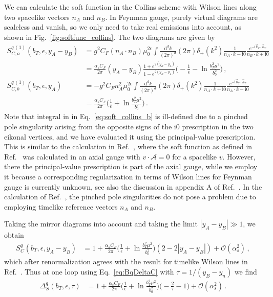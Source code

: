 \documentclass[11pt,a4paper]{article}
\DeclareRobustCommand{\eq}[1]{Eq.~\eqref{eq:#1}}
\DeclareRobustCommand{\fig}[1]{Fig.~\ref{fig:#1}}
\DeclareRobustCommand{\mycite}[1]{Ref.~\cite{#1}}
\newcommand{\df}{\mathrm{d}}
\newcommand{\img}{\mathrm{i}}
\newcommand{\eps}{\epsilon}
\newcommand{\cA}{\mathcal{A}}
\newcommand{\cO}{\mathcal{O}}
\newcommand{\nn}{\nonumber}
\newcommand{\as}{\alpha_s}
\newcommand{\bt}{\vec b_T}
\newcommand{\kt}{\vec k_T}
\begin{document}
We can calculate the soft function in the Collins scheme with Wilson lines along two spacelike vectors $n_A$ and $n_B$.
In Feynman gauge, purely virtual diagrams are scaleless and vanish, so we only need to take real emissions into account, as shown in \fig{softfunc_collins}.
The two diagrams are given by
\begin{align} \label{eq:soft_collins_a}
 S_{C,a}^{q\,(1)}(b_T,\eps,y_A-y_B) &
 = g^2 C_F (n_A{\cdot}n_B) \mu_0^{2\eps} \int\frac{\df^dk}{(2\pi)^d} (2\pi) \delta_+(k^2)
   \frac{1}{n_A \cdot k - \img0} \frac{e^{-\img \bt \cdot \kt}}{n_B \cdot k + \img0}
\nn\\&
 = \frac{\as C_F}{2\pi} (y_A - y_B) \frac{1 + e^{2(y_B-y_A)}}{1 - e^{2(y_B-y_A)}}
   \biggl( - \frac{1}{\eps} - \ln\frac{b_T^2\mu^2}{b_0^2} \biggr)
\,,\\ \label{eq:soft_collins_b}
 S_{C,b}^{q\,(1)}(b_T,\eps,y_A) &
 = - g^2 C_F n_A^2 \mu_0^{2\eps} \int\frac{\df^dk}{(2\pi)^d} (2\pi) \delta_+(k^2)
   \frac{1}{n_A \cdot k + \img0} \frac{e^{-\img \bt \cdot \kt}}{n_A \cdot k - \img0}
 \nn\\&
 = \frac{\as C_F}{2\pi} \biggl( \frac{1}{\eps} + \ln\frac{b_T^2\mu^2}{b_0^2} \biggr)
\,.\end{align}
Note that integral in in \eq{soft_collins_b} is ill-defined due to a pinched pole singularity arising from the opposite signs of the $\img0$ prescription in the two eikonal vertices, and we have evaluated it using the principal-value prescription.
This is similar to the calculation in \mycite{Bacchetta:2008xw}, where the soft function as defined in \mycite{Collins:1981uk} was calculated in an axial gauge with $v \cdot \cA = 0$ for a spacelike $v$.
However, there the principal-value prescription is part of the axial gauge, while we employ it because a corresponding regularization in terms of Wilson lines for Feynman gauge is currently unknown, see also the discussion in appendix A of \mycite{Bacchetta:2008xw}.
In the calculation of \mycite{Ji:2004wu}, the pinched pole singularities do not pose a problem due to employing timelike reference vectors $n_A$ and $n_B$.

Taking the mirror diagrams into account and taking the limit $|y_A-y_B| \gg 1$, we obtain
\begin{align}
 S_C^q(b_T,\eps,y_A-y_B) &= 1 + \frac{\as C_F}{2\pi} \biggl( \frac{1}{\eps} + \ln\frac{b_T^2\mu^2}{b_0^2} \biggr) (2 - 2 |y_A-y_B|) + \cO(\as^2)
\,,\end{align}
which after renormalization agrees with the result for timelike Wilson lines in \mycite{Ji:2004wu}.
Thus at one loop using \eq{BqDeltaC} with $\tau=1/(y_B-y_n)$ we find
\begin{align}
 \Delta_S^q(b_T,\eps,\tau) &
 =  1 + \frac{\as C_F}{2\pi} \biggl( \frac{1}{\eps} + \ln\frac{b_T^2\mu^2}{b_0^2} \biggr) \biggl( -\frac{2}{\tau} - 1 \biggr) + \cO(\as^2)
\,.\end{align}
\end{document}

